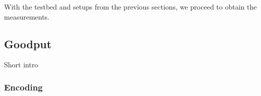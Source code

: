 \label{sec:measurements}

With the testbed and setups from the previous sections, we
proceed to obtain the measurements.

\subsection{Goodput}
Short intro

\subsubsection{Encoding}
%




